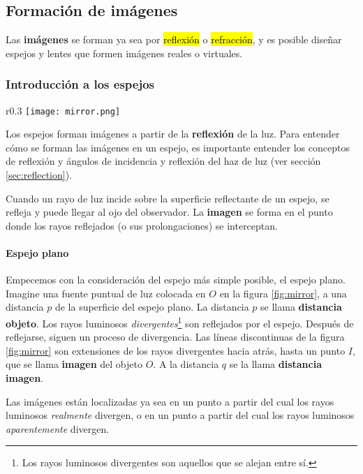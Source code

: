 \subsection{Formación de imágenes}

Las \textbf{imágenes} se forman ya sea por \hl{reflexión} o \hl{refracción}, y es posible diseñar espejos y lentes que formen imágenes reales o virtuales.

\subsubsection{Introducción a los espejos}

\begin{wrapfigure}{r}{0.3\textwidth}
  \centering
  \texttt{[image: mirror.png]}
  \caption{Imagen formada por reflexión en un espejo plano.}
  \label{fig:mirror}
\end{wrapfigure}
Los espejos forman imágenes a partir de la \textbf{reflexión} de la luz. Para entender cómo se forman las imágenes en un espejo, es importante entender los conceptos de reflexión y ángulos de incidencia y reflexión del haz de luz (ver sección \ref{sec:reflection}).

Cuando un rayo de luz incide sobre la superficie reflectante de un espejo, se refleja y puede llegar al ojo del observador. La \textbf{imagen} se forma en el punto donde los rayos reflejados (o sus prolongaciones) se interceptan.

\paragraph{Espejo plano}

Empecemos con la consideración del espejo más simple posible, el espejo plano. Imagine una fuente puntual de luz colocada en \(O\) en la figura \ref{fig:mirror}, a una distancia \(p\) de la superficie del espejo plano. La distancia \(p\) se llama \textbf{distancia objeto}. Los rayos luminosos \textit{divergentes}\footnote{Los rayos luminosos divergentes son aquellos que se alejan entre sí.} son reflejados por el espejo. Después de reflejarse, siguen un proceso de divergencia. Las líneas discontinuas de la figura \ref{fig:mirror} son extensiones de los rayos divergentes hacia atrás, hasta un punto \(I\), que se llama \textbf{imagen} del objeto \(O\). A la distancia \(q\) se la llama \textbf{distancia imagen}. 

Las imágenes están localizadas ya sea en un punto a partir del cual los rayos luminosos \textit{realmente} divergen, o en un punto a partir del cual los rayos luminosos \textit{aparentemente} divergen.

